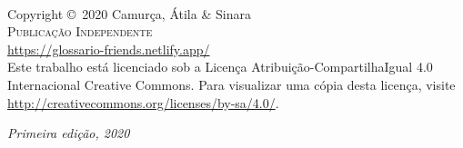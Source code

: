 \documentclass[fleqn]{book} %
\begin{document}



\newpage
~\vfill
\thispagestyle{empty}

\noindent Copyright \copyright\ 2020 Camurça, Átila \& Sinara\\ %

\noindent \textsc{Publicação Independente}\\ %

\noindent \url{https://glossario-friends.netlify.app/}\\ %

\noindent Este trabalho está licenciado sob a Licença Atribuição-CompartilhaIgual 4.0
Internacional Creative Commons. Para visualizar uma cópia desta licença, visite
\url{http://creativecommons.org/licenses/by-sa/4.0/}.

\noindent \textit{Primeira edição, 2020} %

\newpage
\thispagestyle{empty}



\usechapterimagefalse %
\end{document}
